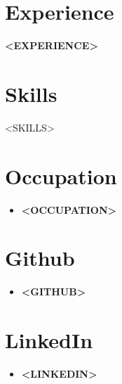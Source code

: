 \documentclass[lighthipster]{simplehipstercv}
\begin{document}
\begin{paracol}{2}
        \section*{Experience}
        \textbf{<EXPERIENCE>}


        \section*{Skills}
        \begin{itemize}
            <SKILLS>
        \end{itemize}

        \vspace{3em}

        \section*{Occupation}
        \begin{itemize}
            \item \textbf{<OCCUPATION>}
        \end{itemize}

        \section*{Github}
        \begin{itemize}
            \item \textbf{<GITHUB>}
        \end{itemize}

        \section*{LinkedIn}
        \begin{itemize}
            \item \textbf{<LINKEDIN>}
        \end{itemize}

        \vfill{}
    \end{paracol}
\end{document}

